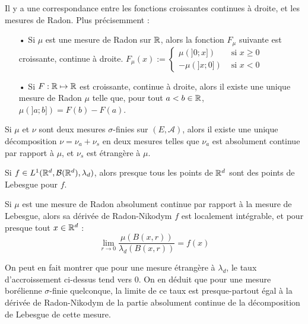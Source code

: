 \documentclass[11pt,a4paper]{article}
\begin{document}
\begin{prop}
Il y a une correspondance entre les fonctions croissantes continues à droite, et les mesures de Radon. Plus précisemment :
\begin{itemize}
\item[•] Si $\mu$ est une mesure de Radon sur $\mathbb R$, alors la fonction $F_{\mu}$ suivante est croissante, continue à droite.
$\displaystyle F_{\mu}(x) := \begin{cases} \mu(]0;x]) & \text{ si } x \geq 0  \\ -\mu(]x;0]) & \text{ si } x < 0 \end{cases}$
\item[•] Si $F : \mathbb R \mapsto \mathbb R$ est croissante, continue à droite, alors il existe une unique mesure de Radon $\mu$ telle que, pour tout $a<b \in \mathbb R$, $\mu(]a;b])=F(b)-F(a)$.
\end{itemize}
\end{prop}

\begin{cor}
Si $\mu$ et $\nu$ sont deux mesures $\sigma$-finies sur $(E,\mathcal{A})$, alors il existe une unique décomposition $\nu = \nu_a + \nu_s$ en deux mesures telles que $\nu_a$ est absolument continue par rapport à $\mu$, et $\nu_s$ est étrangère à $\mu$. 
\end{cor}

\begin{prop}
Si $f \in L^1(\mathbb R^d,\mathcal{B}(\mathbb R^d),\lambda_d)$, alors presque tous les points de $\mathbb R^d$ sont des points de Lebesgue pour $f$.
\end{prop}

\begin{cor}
Si $\mu$ est une mesure de Radon absolument continue par rapport à la mesure de Lebesgue, alors sa dérivée de Radon-Nikodym $f$ est localement intégrable, et pour presque tout $x\in \mathbb R^d$ :
\[\lim\limits_{r \to 0}  \frac{\mu(B(x,r))}{\lambda_d(B(x,r))} = f(x)\]
\end{cor}

\begin{rmq}
On peut en fait montrer que pour une mesure étrangère à $\lambda_d$, le taux d'accroissement ci-dessus tend vers 0. On en déduit que pour une mesure borélienne $\sigma$-finie quelconque, la limite de ce taux est presque-partout égal à la dérivée de Radon-Nikodym de la partie absolument continue de la décomposition de Lebesgue de cette mesure.
\end{rmq}
\end{document}
